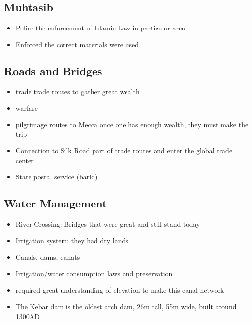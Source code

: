 \documentclass{article}
\begin{document}
\subsection{Muhtasib}
\begin{itemize}
  \item Police the enforcement of Islamic Law
    in particular area
  \item Enforced the correct materials were used
\end{itemize}

\subsection{Roads and Bridges}
\begin{itemize}
  \item trade \rightarrow{} trade routes to gather great wealth
  \item warfare
  \item pilgrimage routes to Mecca \rightarrow{} once one has enough wealth, they must make the trip
  \item Connection to Silk Road \rightarrow{} part of trade routes and enter the global trade center
  \item State postal service (barid) \rightarrow{}
\end{itemize}

\subsection{Water Management}
\begin{itemize}
  \item River Crossing:
    Bridges that were great and still stand today
  \item Irrigation system: they had dry lands
  \item Canals, dams, qanats
  \item Irrigation/water consumption laws and preservation
  \item required great understanding of elevation to make this canal network
  \item The Kebar dam is the oldest arch dam, 26m tall, 55m wide, built around 1300AD
\end{itemize}
\end{document}
